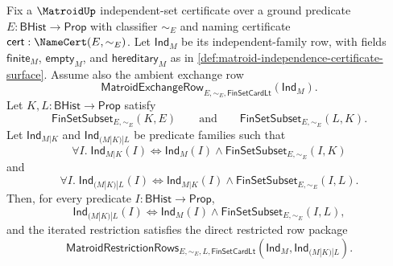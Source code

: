 \begin{theorem}
\label{thm:matroid-restrictions-compose-direct-restriction}
Fix a $\MatroidUp$ independent-set certificate over a ground predicate $E:\mathsf{BHist}\to\mathsf{Prop}$ with classifier $\sim_E$ and naming certificate $\mathsf{cert}:\NameCert(E,\sim_E)$. Let $\mathsf{Ind}_M$ be its independent-family row, with fields $\mathsf{finite}_M$, $\mathsf{empty}_M$, and $\mathsf{hereditary}_M$ as in \autoref{def:matroid-independence-certificate-surface}. Assume also the ambient exchange row
$$
\mathsf{MatroidExchangeRow}_{E,\sim_E,\mathsf{FinSetCardLt}}(\mathsf{Ind}_M).
$$
Let $K,L:\mathsf{BHist}\to\mathsf{Prop}$ satisfy
$$
\mathsf{FinSetSubset}_{E,\sim_E}(K,E)
\qquad\text{and}\qquad
\mathsf{FinSetSubset}_{E,\sim_E}(L,K).
$$
Let $\mathsf{Ind}_{M|K}$ and $\mathsf{Ind}_{(M|K)|L}$ be predicate families such that
$$
\forall I.\;
\mathsf{Ind}_{M|K}(I)\Longleftrightarrow
\mathsf{Ind}_M(I)\land\mathsf{FinSetSubset}_{E,\sim_E}(I,K)
$$
and
$$
\forall I.\;
\mathsf{Ind}_{(M|K)|L}(I)\Longleftrightarrow
\mathsf{Ind}_{M|K}(I)\land\mathsf{FinSetSubset}_{E,\sim_E}(I,L).
$$
Then, for every predicate $I:\mathsf{BHist}\to\mathsf{Prop}$,
$$
\mathsf{Ind}_{(M|K)|L}(I)\Longleftrightarrow
\mathsf{Ind}_M(I)\land\mathsf{FinSetSubset}_{E,\sim_E}(I,L),
$$
and the iterated restriction satisfies the direct restricted row package
$$
\mathsf{MatroidRestrictionRows}_{E,\sim_E,L,\mathsf{FinSetCardLt}}
(\mathsf{Ind}_M,\mathsf{Ind}_{(M|K)|L}).
$$
\end{theorem}
